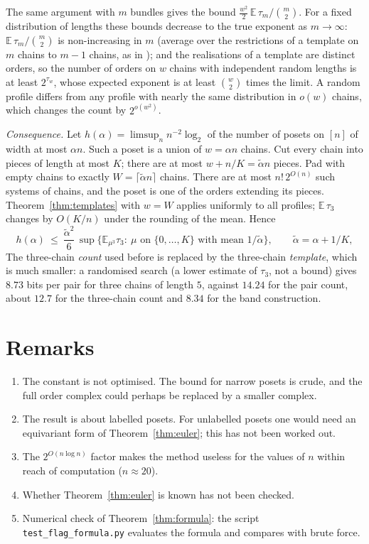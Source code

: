 \documentclass[11pt]{article}
\theoremstyle{definition}
\theoremstyle{remark}
\begin{document}
The same argument with $m$ bundles gives the bound
$\frac{w^2}{2}\,\mathbb{E}\,\tau_m/\binom m2$. For a fixed distribution of lengths these
bounds decrease to the true exponent as $m\to\infty$: $\mathbb{E}\,\tau_m/\binom m2$ is
non-increasing in $m$ (average over the restrictions of a template on $m$ chains to $m-1$
chains, as in \cite[Prop.~2.10]{FOU}); and the realisations of a template are distinct
orders, so the number of orders on $w$ chains with independent random lengths is at least
$2^{\tau_w}$, whose expected exponent is at least $\binom w2$ times the limit. A random
profile differs from any profile with nearly the same distribution in $o(w)$ chains, which
changes the count by $2^{o(w^2)}$.

\medskip\noindent\emph{Consequence.} Let $h(\alpha)=\limsup_n n^{-2}\log_2$ of the number
of posets on $[n]$ of width at most $\alpha n$. Such a poset is a union of $w=\alpha n$
chains. Cut every chain into pieces of length at most $K$; there are at most
$w+n/K=\tilde\alpha n$ pieces. Pad with empty chains to exactly
$W=\lceil\tilde\alpha n\rceil$ chains. There are at most $n!\,2^{O(n)}$ such systems of
chains, and the poset is one of the orders extending its pieces. Theorem~\ref{thm:templates}
with $w=W$ applies uniformly to all profiles; $\mathbb{E}\,\tau_3$ changes by $O(K/n)$ under
the rounding of the mean. Hence
\[
h(\alpha)\ \le\ \frac{\tilde\alpha^{2}}{6}\,\sup\bigl\{\mathbb{E}_{\mu^{3}}\tau_3:\ 
\mu\text{ on }\{0,\dots,K\}\text{ with mean }1/\tilde\alpha\bigr\},\qquad
\tilde\alpha=\alpha+1/K,
\]
The three-chain \emph{count} used before is replaced by the three-chain \emph{template}, which
is much smaller: a randomised search (a lower estimate of $\tau_3$, not a bound) gives
$8.73$ bits per pair for three chains of length $5$, against $14.24$ for the pair count,
about $12.7$ for the three-chain count and $8.34$ for the band construction.

\section{Remarks}

\begin{enumerate}
\item The constant is not optimised. The bound for narrow posets is crude, and the full
order complex could perhaps be replaced by a smaller complex.
\item The result is about labelled posets. For unlabelled posets one would need an
equivariant form of Theorem~\ref{thm:euler}; this has not been worked out.
\item The $2^{O(n\log n)}$ factor makes the method useless for the values of $n$ within
reach of computation ($n\approx20$).
\item Whether Theorem~\ref{thm:euler} is known has not been checked.
\item Numerical check of Theorem~\ref{thm:formula}: the script
\texttt{test\_flag\_formula.py} evaluates the formula and compares with brute force.
\end{enumerate}
\end{document}
